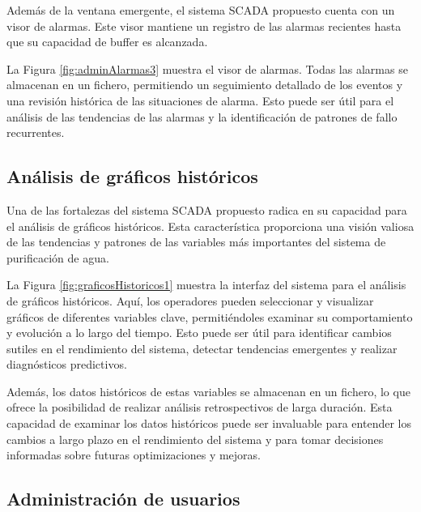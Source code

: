 Además de la ventana emergente, el sistema SCADA propuesto cuenta con un visor de alarmas. Este visor mantiene un registro de las alarmas recientes hasta que su capacidad de buffer es alcanzada.


La Figura \ref{fig:adminAlarmas3} muestra el visor de alarmas. Todas las alarmas se almacenan en un fichero, permitiendo un seguimiento detallado de los eventos y una revisión histórica de las situaciones de alarma. Esto puede ser útil para el análisis de las tendencias de las alarmas y la identificación de patrones de fallo recurrentes.

\subsection{Análisis de gráficos históricos}

Una de las fortalezas del sistema SCADA propuesto radica en su capacidad para el análisis de gráficos históricos. Esta característica proporciona una visión valiosa de las tendencias y patrones de las variables más importantes del sistema de purificación de agua.


La Figura \ref{fig:graficosHistoricos1} muestra la interfaz del sistema para el análisis de gráficos históricos. Aquí, los operadores pueden seleccionar y visualizar gráficos de diferentes variables clave, permitiéndoles examinar su comportamiento y evolución a lo largo del tiempo. Esto puede ser útil para identificar cambios sutiles en el rendimiento del sistema, detectar tendencias emergentes y realizar diagnósticos predictivos.

Además, los datos históricos de estas variables se almacenan en un fichero, lo que ofrece la posibilidad de realizar análisis retrospectivos de larga duración. Esta capacidad de examinar los datos históricos puede ser invaluable para entender los cambios a largo plazo en el rendimiento del sistema y para tomar decisiones informadas sobre futuras optimizaciones y mejoras.

\subsection{Administración de usuarios}

